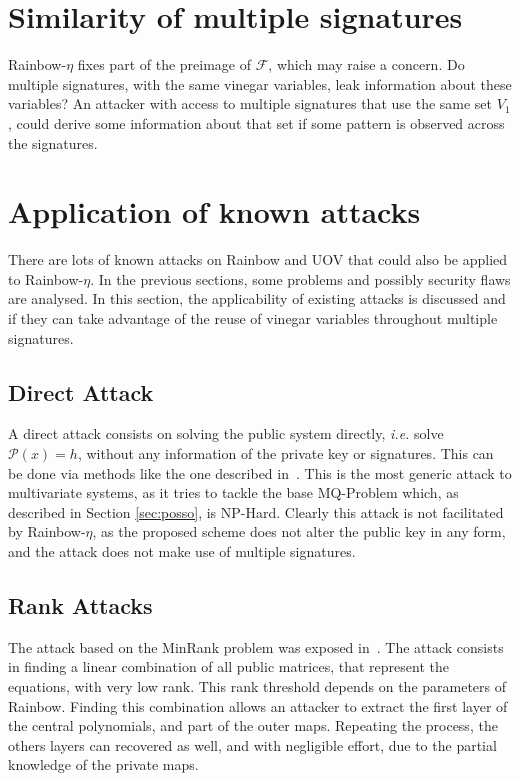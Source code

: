 \documentclass{ufsctex/ufsctex}
\begin{document}
\section{Similarity of multiple signatures}

Rainbow-$\eta$ fixes part of the preimage of $\mathcal{F}$, which may raise a
concern. Do multiple signatures, with the same vinegar variables, leak
information about these variables? An attacker with access to multiple
signatures that use the same set $V_1$, could derive some information about
that set if some pattern is observed across the signatures.


\section{Application of known attacks}

There are lots of known attacks on Rainbow and UOV that could also be applied
to Rainbow-$\eta$. In the previous sections, some problems and possibly
security flaws are analysed. In this section, the applicability of existing
attacks is discussed and if they can take advantage of the reuse of vinegar
variables throughout multiple signatures.

\subsection{Direct Attack}

A direct attack consists on solving the public system directly, \textit{i.e.}
solve $\mathcal{P}(x) = h$, without any information of the private key or
signatures. This can be done via methods like the one described
in~\cite{bettale2009hybrid}. This is the most generic attack to multivariate
systems, as it tries to tackle the base MQ-Problem which, as described in
Section \ref{sec:posso}, is NP-Hard. Clearly this attack is not facilitated by
Rainbow-$\eta$, as the proposed scheme does not alter the public key in any
form, and the attack does not make use of multiple signatures.

\subsection{Rank Attacks}

The attack based on the MinRank problem was exposed
in~\cite{billet2006cryptanalysis}. The attack consists in finding a linear
combination of all public matrices, that represent the equations, with very low
rank. This rank threshold depends on the parameters of Rainbow. Finding this
combination allows an attacker to extract the first layer of the central
polynomials, and part of the outer maps. Repeating the process, the others
layers can recovered as well, and with negligible effort, due to the partial
knowledge of the private maps.
\end{document}
